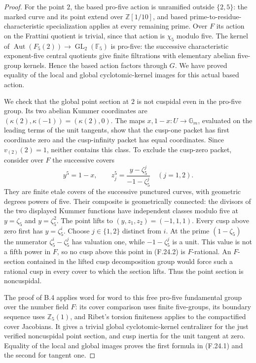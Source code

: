 \begin{proof}
For the point $2$, the based pro-five action is unramified
outside $\{2,5\}$: the marked curve and its point extend over
$\mathbb Z[1/10]$, and based prime-to-residue-characteristic
specialization applies at every remaining prime.  Over $F$
its action on the Frattini quotient is trivial, since that
action is $\chi_5$ modulo five.  The kernel of
$\operatorname{Aut}(F_5(2))\to\operatorname{GL}_2(\mathbb F_5)$
is pro-five: the successive characteristic exponent-five
central quotients give finite filtrations with elementary
abelian five-group kernels.  Hence the based action factors
through $G$.  We have proved equality of the local and global
cyclotomic-kernel images for this actual based action.

We check that the global point section at $2$ is not cuspidal
even in the pro-five group.  Its two abelian Kummer coordinates
are $(\kappa(2),\kappa(-1))=(\kappa(2),0)$.
The maps $x,1-x:U\to\mathbb G_m$, evaluated on the leading
terms of the unit tangents, show that the cusp-one packet has
first coordinate zero and the cusp-infinity packet has equal
coordinates.  Since $v_{(2)}(2)=1$, neither contains this class.
To exclude the cusp-zero packet, consider over $F$ the
successive covers
\[
 y^5=1-x,\qquad
 z_j^5=\frac{y-\zeta_5^j}{-1-\zeta_5^j}\quad(j=1,2).       \tag{F.24.2}
\]
They are finite etale covers of the successive punctured
curves, with geometric degrees powers of five.  Their
composite is geometrically connected: the divisors of the two
displayed Kummer functions have independent classes modulo
five at $y=\zeta_5$ and $y=\zeta_5^2$.
The point lifts to $(y,z_1,z_2)=(-1,1,1)$.
Every cusp above zero first has $y=\zeta_5^i$.  Choose
$j\in\{1,2\}$ distinct from $i$.
At the prime $(1-\zeta_5)$ the numerator
$\zeta_5^i-\zeta_5^j$ has valuation one, while
$-1-\zeta_5^j$ is a unit.  This value is not a fifth power
in $F$, so no cusp above this point in (F.24.2) is $F$-rational.
An $F$-section contained in the lifted cusp decomposition group
would force such a rational cusp in every cover to which the
section lifts.  Thus the point section is noncuspidal.

The proof of B.4 applies word for word to this free pro-five
fundamental group over the number field $F$: its cover
comparison uses finite five-groups, its boundary sequence
uses $\mathbb Z_5(1)$, and Ribet's torsion finiteness applies
to the compactified cover Jacobians.  It gives a trivial global
cyclotomic-kernel centralizer for the just verified noncuspidal
point section, and cusp inertia for the unit tangent at zero.
Equality of the local and global images proves the first
formula in (F.24.1) and the second for tangent one.


\end{proof}
